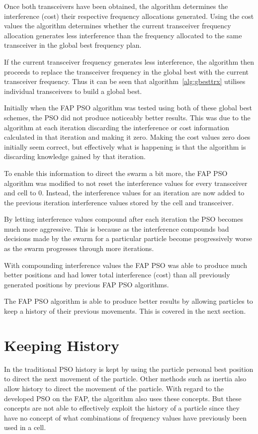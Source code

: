 Once both transceivers have been obtained, the algorithm determines the interference (cost) their respective frequency allocations generated. Using the cost values the algorithm determines whether the current transceiver frequency allocation generates less interference than the frequency allocated to the same transceiver in the global best frequency plan.

If the current transceiver frequency generates less interference, the algorithm then proceeds to replace the transceiver frequency in the global best with the current transceiver frequency. Thus it can be seen that algorithm~\ref{alg:gbesttrx} utilises individual transceivers to build a global best.

Initially when the \gls{FAP} \gls{PSO} algorithm was tested using both of these global best schemes, the \gls{PSO} did not produce noticeably better results. This was due to the algorithm at each iteration discarding the interference or cost information calculated in that iteration and making it zero. Making the cost values zero does initially seem correct, but effectively what is happening is that the algorithm is discarding knowledge gained by that iteration.

To enable this information to direct the swarm a bit more, the \gls{FAP} \gls{PSO} algorithm was modified to not reset the interference values for every transceiver and cell to 0. Instead, the interference values for an iteration are now added to the previous iteration interference values stored by the cell and transceiver. 

By letting interference values compound after each iteration the \gls{PSO} becomes much more aggressive. This is because as the interference compounds bad decisions made by the swarm for a particular particle become progressively worse as the swarm progresses through more iterations.

With compounding interference values the \gls{FAP} \gls{PSO} was able to produce much better positions and had lower total interference (cost) than all previously generated positions by previous \gls{FAP} \gls{PSO} algorithms. 

The \gls{FAP} \gls{PSO} algorithm is able to produce better results by allowing particles to keep a history of their previous movements. This is covered in the next section.
\section{Keeping History}
\label{sec:keepinghistory}
In the traditional \gls{PSO} history is kept by using the particle personal best position to direct the next movement of the particle. Other methods such as inertia also allow history to direct the movement of the particle. With regard to the developed \gls{PSO} on the \gls{FAP}, the algorithm also uses these concepts. But these concepts are not able to effectively exploit the history of a particle since they have no concept of what combinations of frequency values have previously been used in a cell.

